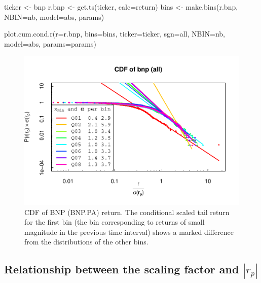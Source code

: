 \documentclass[
  11pt,
]{article}
\newenvironment{Shaded}{\begin{snugshade}}{\end{snugshade}}
\newcommand{\AttributeTok}[1]{\textcolor[rgb]{0.77,0.63,0.00}{#1}}
\newcommand{\FunctionTok}[1]{\textcolor[rgb]{0.00,0.00,0.00}{#1}}
\newcommand{\NormalTok}[1]{#1}
\newcommand{\OtherTok}[1]{\textcolor[rgb]{0.56,0.35,0.01}{#1}}
\newcommand{\StringTok}[1]{\textcolor[rgb]{0.31,0.60,0.02}{#1}}
\begin{document}
\begin{Shaded}
\begin{Highlighting}[]
\NormalTok{ticker }\OtherTok{\textless{}{-}} \StringTok{\textquotesingle{}bnp\textquotesingle{}}
\NormalTok{r.bnp }\OtherTok{\textless{}{-}} \FunctionTok{get.ts}\NormalTok{(ticker, }\AttributeTok{calc=}\StringTok{\textquotesingle{}return\textquotesingle{}}\NormalTok{)}
\NormalTok{bins }\OtherTok{\textless{}{-}} \FunctionTok{make.bins}\NormalTok{(r.bnp, }\AttributeTok{NBIN=}\NormalTok{nb, }\AttributeTok{model=}\StringTok{\textquotesingle{}abs\textquotesingle{}}\NormalTok{, params)}
\end{Highlighting}
\end{Shaded}

\begin{Shaded}
\begin{Highlighting}[]
\FunctionTok{plot.cum.cond.r}\NormalTok{(}\AttributeTok{r=}\NormalTok{r.bnp, }\AttributeTok{bins=}\NormalTok{bins, }\AttributeTok{ticker=}\NormalTok{ticker, }\AttributeTok{sgn=}\StringTok{\textquotesingle{}all\textquotesingle{}}\NormalTok{,}
\AttributeTok{NBIN=}\NormalTok{nb, }\AttributeTok{model=}\StringTok{\textquotesingle{}abs\textquotesingle{}}\NormalTok{, }\AttributeTok{params=}\NormalTok{params)}
\end{Highlighting}
\end{Shaded}

\begin{figure}[H]
\includegraphics[width=0.7\linewidth,height=0.7\textheight]{figs/bnp2-1} \caption{CDF of BNP (BNP.PA) return. The conditional scaled tail return for the first bin (the bin corresponding to returns of small magnitude in the previous time interval) shows a marked difference from the distributions of the other bins.}\label{fig:bnp2}
\end{figure}

\hypertarget{relationship-between-the-scaling-factor-and-r_p}{%
\subsection{\texorpdfstring{Relationship between the scaling factor and \(|r_p|\)}{Relationship between the scaling factor and \textbar r\_p\textbar{}}}\label{relationship-between-the-scaling-factor-and-r_p}}
\end{document}
